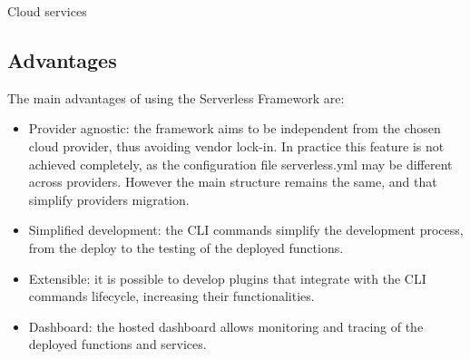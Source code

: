 \begin{chapter}{Cloud services}
    \subsection{Advantages}
    The main advantages of using the Serverless Framework are:
    \begin{itemize}
        \item Provider agnostic: the framework aims to be independent from the chosen
            cloud provider, thus avoiding vendor lock-in. In practice this feature is
            not achieved completely, as the configuration file serverless.yml may be
            different across providers. However the main structure remains the same,
            and that simplify providers migration.
        \item Simplified development: the CLI commands simplify the development process,
            from the deploy to the testing of the deployed functions.
        \item Extensible: it is possible to develop plugins that integrate with the
            CLI commands lifecycle, increasing their functionalities.
        \item Dashboard: the hosted dashboard allows monitoring and tracing of the
            deployed functions and services.
    \end{itemize}


\end{chapter}
